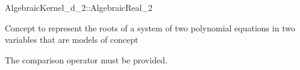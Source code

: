 \begin{ccRefConcept}{AlgebraicKernel_d_2::AlgebraicReal_2}

\ccDefinition

Concept to represent the roots of a system of two polynomial equations 
in two variables 
that are models of concept 

\ccRefines
{}



\ccOperations

The comparison operator \ccc{==} must be provided. 


\ccHasModels

\ccSeeAlso

\end{ccRefConcept}
